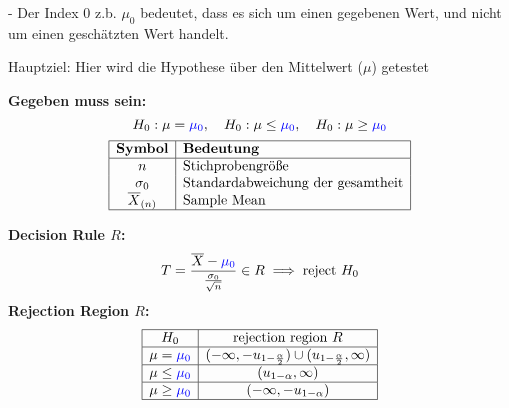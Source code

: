 - Der Index 0 z.b. $\mu_0$ bedeutet, dass es sich um einen gegebenen Wert, und nicht um einen geschätzten Wert handelt.

\begin{center}

Hauptziel: Hier wird die Hypothese über den
Mittelwert ($\mu$) getestet
\end{center}
\begin{center}
\end{center}


\large{\textbf{Gegeben muss sein:}}
\[
H_0: \mu = \textcolor{blue}{\mu_0}, \quad H_0: \mu \leq \textcolor{blue}{\mu_0}, \quad H_0: \mu \geq \textcolor{blue}{\mu_0}
\]
\[
\begin{array}{|c|l|}
\hline
\textbf{Symbol} & \textbf{Bedeutung} \\
\hline
n & \text{Stichprobengröße} \\
\sigma_0 & \text{Standardabweichung der gesamtheit} \\
\overline{X}_{(n)} & \text{Sample Mean} \\
\hline
\end{array}
\]

\normalsize
\begin{comment}
\large{\textbf{Teststatistik:}}
\[
T = \frac{\overline{X}_{(n)} - \textcolor{blue}{\mu}}{\frac{\sigma_0}{\sqrt{n}}} \sim N(0,1)
\]
\end{comment}
\large{\textbf{Decision Rule  \(R\):}}
\[
T = \frac{\overline{X} - \textcolor{blue}{\mu_0}}{\frac{\sigma_0}{\sqrt{n}}} \in R \implies \text{reject } H_0
\]
\large{\textbf{Rejection Region \(R\):}}
\[
\begin{array}{|c|c|}
\hline
H_0 & \text{rejection region } R \\ \hline
\mu = \textcolor{blue}{\mu_0} & (-\infty, -u_{1-\frac{\alpha}{2}}) \cup (u_{1-\frac{\alpha}{2}}, \infty) \\ \hline
\mu \leq \textcolor{blue}{\mu_0} & (u_{1-\alpha}, \infty) \\ \hline
\mu \geq \textcolor{blue}{\mu_0} & (-\infty, -u_{1-\alpha}) \\ \hline
\end{array}
\]
\centering{}

